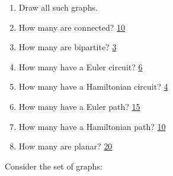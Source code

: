 \begin{questions}
    \begin{minipage}[T]{0.55\textwidth}
    \begin{enumerate}[label=(\alph*),topsep=1pt,parsep=1pt,itemsep=0pt]
        \item Draw all such graphs. 
        \item  How many are connected? \ifprintanswers \underline{10} \fi
        \item  How many are bipartite? \ifprintanswers \underline{3} \fi
        \item  How many have a Euler circuit? \ifprintanswers \underline{6} \fi
        \item  How many have a Hamiltonian circuit? \ifprintanswers \underline{4} \fi
        \item  How many have a Euler path? \ifprintanswers \underline{15} \fi
        \item  How many have a Hamiltonian path? \ifprintanswers \underline{10} \fi
        \item  How many are planar? \ifprintanswers \underline{20} \fi
    \end{enumerate}
    \end{minipage}
        
    \ifprintanswers
        \vspace{-5pt}
    \fi
    \begin{solution}Consider the set of graphs:

        
    \end{solution}


\end{questions}


